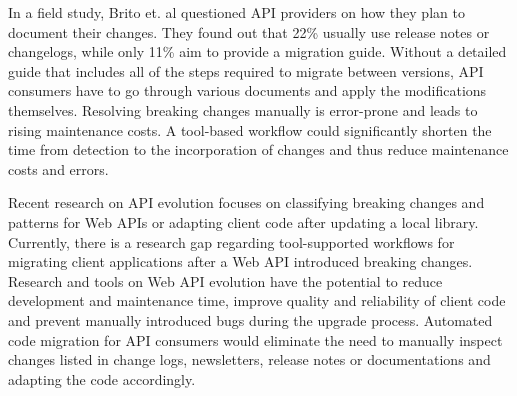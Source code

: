 \begin{figure}[h]
\end{figure}

In a field study, Brito et. al questioned API providers on how they plan to document their changes. They found out that 22\% usually use release notes or changelogs, while only 11\% aim to provide a migration guide. Without a detailed guide that includes all of the steps required to migrate between versions, API consumers have to go through various documents and apply the modifications themselves. Resolving breaking changes manually is error-prone and leads to rising maintenance costs. A tool-based workflow could significantly shorten the time from detection to the incorporation of changes and thus reduce maintenance costs and errors.

Recent research on API evolution focuses on classifying breaking changes and patterns for Web APIs or adapting client code after updating a local library. Currently, there is a research gap regarding tool-supported workflows for migrating client applications after a Web API introduced breaking changes. Research and tools on Web API evolution have the potential to reduce development and maintenance time, improve quality and reliability of client code and prevent manually introduced bugs during the upgrade process. Automated code migration for API consumers would eliminate the need to manually inspect changes listed in change logs, newsletters, release notes or documentations and adapting the code accordingly. 